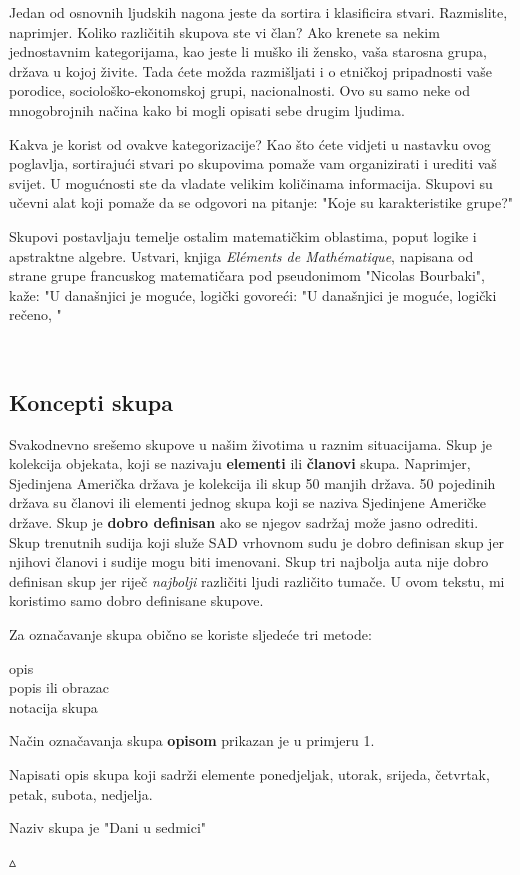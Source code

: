 \documentclass[a4paper,14pt,svgnames]{article}
\newcounter{counter}
\newcommand{\examplecounter}{\textbf{\refstepcounter{counter}PRIMJER \thecounter}}
\newcommand{\example}[3]{\begin{tcolorbox}[title=\large \examplecounter \hfill\small\textbf{"#1"}]
#2
\begin{tcolorbox}[title=\small \textbf{RJEŠENJE},colback=white]
\begin{center}
#3

\vspace{0.5em}\hfill $\vartriangle$
\end{center}
\end{tcolorbox}
\end{tcolorbox}}
\begin{document}
\bigskip\bigskip
\begin{Large}
Jedan od osnovnih ljudskih nagona jeste da sortira i klasificira stvari. Razmislite, naprimjer. Koliko različitih skupova ste vi član? Ako krenete sa nekim jednostavnim kategorijama, kao jeste li muško ili žensko, vaša starosna grupa, država u kojoj živite. Tada ćete možda razmišljati i o etničkoj pripadnosti vaše porodice, sociološko-ekonomskoj grupi, nacionalnosti. Ovo su samo neke od mnogobrojnih načina kako bi mogli opisati sebe drugim ljudima.\par
Kakva je korist od ovakve kategorizacije? Kao što ćete vidjeti u nastavku ovog poglavlja, sortirajući stvari po skupovima pomaže vam organizirati i urediti vaš svijet. U mogućnosti ste da vladate velikim količinama informacija. Skupovi su učevni alat koji pomaže da se odgovori na pitanje: "Koje su karakteristike grupe?"\par
Skupovi postavljaju temelje ostalim matematičkim oblastima, poput logike i apstraktne algebre. Ustvari, knjiga \textit{El\' ements de Math\' ematique}, napisana od strane grupe francuskog matematičara pod pseudonimom "Nicolas Bourbaki", kaže: "U današnjici je moguće, logički govoreći: "U današnjici je moguće, logički rečeno, "
\end{Large}\\[\baselineskip]
\subsection{Koncepti skupa}

Svakodnevno srešemo skupove u našim životima u raznim situacijama. Skup je kolekcija objekata, koji se nazivaju \textbf{elementi} ili \textbf{članovi} skupa. Naprimjer, Sjedinjena Američka država je kolekcija ili skup 50 manjih država. 50 pojedinih država su članovi ili elementi jednog skupa koji se naziva Sjedinjene Američke države.
Skup je \textbf{dobro definisan} ako se njegov sadržaj može jasno odrediti. Skup trenutnih sudija koji služe SAD vrhovnom sudu je dobro definisan skup jer njihovi članovi i sudije mogu biti imenovani. Skup tri najbolja auta nije dobro definisan skup jer riječ \textit{najbolji} različiti ljudi različito tumače. U ovom tekstu, mi koristimo samo dobro definisane skupove.

Za označavanje skupa obično se koriste sljedeće tri metode:
\begin{center}
opis\\
popis ili obrazac\\
notacija skupa
\end{center}
Način označavanja skupa \textbf{opisom} prikazan je u primjeru 1.
\example{Opis skupova}{Napisati opis skupa koji sadrži elemente ponedjeljak, utorak, srijeda, četvrtak, petak, subota, nedjelja.}{Naziv skupa je "Dani u sedmici"}
\end{document}
